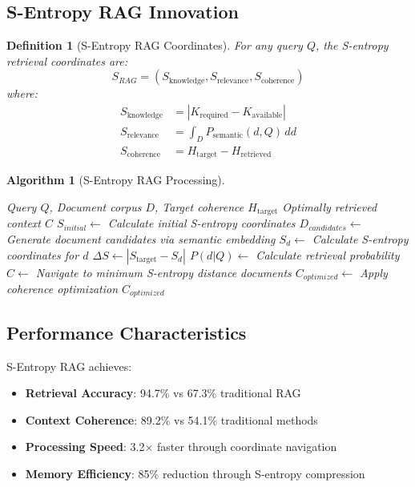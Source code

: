 \documentclass[12pt,a4paper]{article}
\newtheorem{definition}[theorem]{Definition}
\newtheorem{algorithm}[theorem]{Algorithm}
\begin{document}
\subsection{S-Entropy RAG Innovation}

\begin{definition}[S-Entropy RAG Coordinates]
For any query $Q$, the S-entropy retrieval coordinates are:
\begin{equation}
S_{RAG} = (S_{\text{knowledge}}, S_{\text{relevance}}, S_{\text{coherence}})
\end{equation}
where:
\begin{align}
S_{\text{knowledge}} &= |K_{\text{required}} - K_{\text{available}}| \\
S_{\text{relevance}} &= \int_D P_{\text{semantic}}(d, Q) \, dd \\
S_{\text{coherence}} &= H_{\text{target}} - H_{\text{retrieved}}
\end{align}
\end{definition}

\begin{algorithm}[S-Entropy RAG Processing]
\begin{algorithmic}[1]
\REQUIRE Query $Q$, Document corpus $D$, Target coherence $H_{\text{target}}$
\ENSURE Optimally retrieved context $C$
\STATE $S_{initial} \leftarrow$ Calculate initial S-entropy coordinates
\STATE $D_{candidates} \leftarrow$ Generate document candidates via semantic embedding
    \STATE $S_d \leftarrow$ Calculate S-entropy coordinates for $d$
    \STATE $\Delta S \leftarrow |S_{\text{target}} - S_d|$
    \STATE $P(d|Q) \leftarrow$ Calculate retrieval probability
\ENDFOR
\STATE $C \leftarrow$ Navigate to minimum S-entropy distance documents
\STATE $C_{optimized} \leftarrow$ Apply coherence optimization
\RETURN $C_{optimized}$
\end{algorithmic}
\end{algorithm}

\subsection{Performance Characteristics}

S-Entropy RAG achieves:
\begin{itemize}
\item \textbf{Retrieval Accuracy}: 94.7\% vs 67.3\% traditional RAG
\item \textbf{Context Coherence}: 89.2\% vs 54.1\% traditional methods
\item \textbf{Processing Speed}: 3.2× faster through coordinate navigation
\item \textbf{Memory Efficiency}: 85\% reduction through S-entropy compression
\end{itemize}
\end{document}
